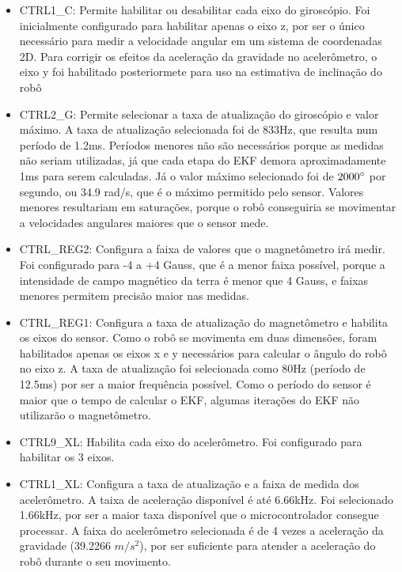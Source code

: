 \documentclass[
	12pt,				%
	openright,			%
	twoside,			%
	convert,
	a4paper,			%
	english,			%
	french,				%
	spanish,			%
	brazil				%
	]{abntex2}
\begin{document}
\begin{itemize}
   \item 
   CTRL1\_C: Permite habilitar ou desabilitar cada eixo do giroscópio. Foi inicialmente configurado para habilitar apenas o eixo z, por ser o único necessário para medir a velocidade angular em um sistema de coordenadas 2D. Para corrigir os efeitos da aceleração da gravidade no acelerômetro, o eixo y foi habilitado posteriormete para uso na estimativa de inclinação do robô
   \item
   CTRL2\_G: Permite selecionar a taxa de atualização do giroscópio e valor máximo. A taxa de atualização selecionada foi de 833Hz, que resulta num período de 1.2ms. Períodos menores não são necessários porque as medidas não seriam utilizadas, já que cada etapa do EKF demora aproximadamente 1ms para serem calculadas. Já o valor máximo selecionado foi de $2000\degree$ por segundo, ou 34.9 rad/s, que é o máximo permitido pelo sensor. Valores menores resultariam em saturações, porque o robô conseguiria se movimentar a velocidades angulares maiores que o sensor mede.
   	\item
   	CTRL\_REG2: Configura a faixa de valores que o magnetômetro irá medir. Foi configurado para -4 a +4 Gauss, que é a menor faixa possível, porque a intensidade de campo magnético da terra é menor que 4 Gauss, e faixas menores permitem precisão maior nas medidas.
	\item
	CTRL\_REG1: Configura a taxa de atualização do magnetômetro e habilita os eixos do sensor. Como o robô se movimenta em duas dimensões, foram habilitados apenas os eixos x e y necessários para calcular o ângulo do robô no eixo z. A taxa de atualização foi selecionada como 80Hz (período de 12.5ms) por ser a maior frequência possível. Como o período do sensor é maior que o tempo de calcular o EKF, algumas iterações do EKF não utilizarão o magnetômetro.
	\item
	CTRL9\_XL: Habilita cada eixo do acelerômetro. Foi configurado para habilitar os 3 eixos.
	\item
	CTRL1\_XL: Configura a taxa de atualização e a faixa de medida dos acelerômetro.  A taixa de aceleração disponível é até 6.66kHz. Foi selecionado 1.66kHz, por ser a maior taxa disponível que o microcontrolador consegue processar. A faixa do acelerômetro selecionada é de 4 vezes a aceleração da gravidade (39.2266 $m/s^{2}$), por ser suficiente para atender a aceleração do robô durante o seu movimento.
\end{itemize}
\par
\end{document}
